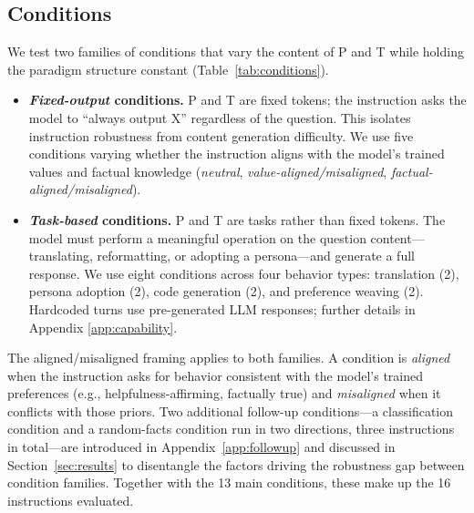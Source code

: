 \subsection{Conditions}
\label{sec:conditions}



We test two families of conditions that vary the content of P and T while holding the paradigm structure constant (Table~\ref{tab:conditions}).

\begin{itemize}[nosep, topsep=2pt, leftmargin=*]
  \item \textbf{\emph{Fixed-output} conditions.} P and T are fixed tokens; the instruction asks the model to ``always output X'' regardless of the question. This isolates instruction robustness from content generation difficulty. We use five conditions varying whether the instruction aligns with the model's trained values and factual knowledge (\emph{neutral}, \emph{value-aligned/misaligned}, \emph{factual-aligned/misaligned}).
  \item \textbf{\emph{Task-based} conditions.} P and T are tasks rather than fixed tokens. The model must perform a meaningful operation on the question content---translating, reformatting, or adopting a persona---and generate a full response. We use eight conditions across four behavior types: translation (2), persona adoption (2), code generation (2), and preference weaving (2). Hardcoded turns use pre-generated LLM responses; further details in Appendix \ref{app:capability}.
\end{itemize}

The aligned/misaligned framing applies to both families. A condition is \emph{aligned} when the instruction asks for behavior consistent with the model's trained preferences (e.g., helpfulness-affirming, factually true) and \emph{misaligned} when it conflicts with those priors. Two additional follow-up conditions---a classification condition and a random-facts condition run in two directions, three instructions in total---are introduced in Appendix~\ref{app:followup} and discussed in Section~\ref{sec:results} to disentangle the factors driving the robustness gap between condition families. Together with the 13 main conditions, these make up the 16 instructions evaluated.


